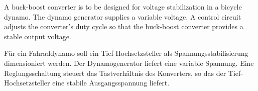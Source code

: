 


A buck-boost converter is to be designed for voltage stabilization in a bicycle dynamo.
The dynamo generator supplies a variable voltage. A control circuit adjusts the converter's duty cycle
so that the buck-boost converter provides a stable output voltage.

\begin{germanblock}
	Für ein Fahraddynamo soll ein Tief-Hochsetzsteller als Spannungsstabilisierung dimensioniert werden.
	Der Dynamogenerator liefert eine variable Spannung. Eine Reglungsschaltung steuert das Tastverhältnis des Konverters,
	so das der Tief-Hochsetzsteller eine stabile Ausgangsspannung liefert.
\end{germanblock}



